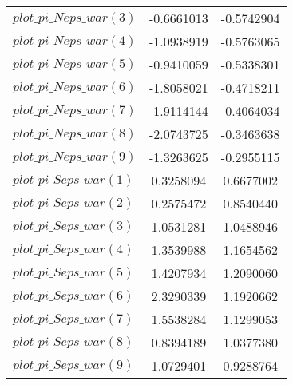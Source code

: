 \begin{center}
\begin{longtable}{lcc}
$plot\_pi\_N eps\_war (3)   $	 & 	     -0.6661013	 & 	     -0.5742904 \\ 
$plot\_pi\_N eps\_war (4)   $	 & 	     -1.0938919	 & 	     -0.5763065 \\ 
$plot\_pi\_N eps\_war (5)   $	 & 	     -0.9410059	 & 	     -0.5338301 \\ 
$plot\_pi\_N eps\_war (6)   $	 & 	     -1.8058021	 & 	     -0.4718211 \\ 
$plot\_pi\_N eps\_war (7)   $	 & 	     -1.9114144	 & 	     -0.4064034 \\ 
$plot\_pi\_N eps\_war (8)   $	 & 	     -2.0743725	 & 	     -0.3463638 \\ 
$plot\_pi\_N eps\_war (9)   $	 & 	     -1.3263625	 & 	     -0.2955115 \\ 
$plot\_pi\_S eps\_war (1)   $	 & 	      0.3258094	 & 	      0.6677002 \\ 
$plot\_pi\_S eps\_war (2)   $	 & 	      0.2575472	 & 	      0.8540440 \\ 
$plot\_pi\_S eps\_war (3)   $	 & 	      1.0531281	 & 	      1.0488946 \\ 
$plot\_pi\_S eps\_war (4)   $	 & 	      1.3539988	 & 	      1.1654562 \\ 
$plot\_pi\_S eps\_war (5)   $	 & 	      1.4207934	 & 	      1.2090060 \\ 
$plot\_pi\_S eps\_war (6)   $	 & 	      2.3290339	 & 	      1.1920662 \\ 
$plot\_pi\_S eps\_war (7)   $	 & 	      1.5538284	 & 	      1.1299053 \\ 
$plot\_pi\_S eps\_war (8)   $	 & 	      0.8394189	 & 	      1.0377380 \\ 
$plot\_pi\_S eps\_war (9)   $	 & 	      1.0729401	 & 	      0.9288764 \\ 
\end{longtable}
 \end{center}
